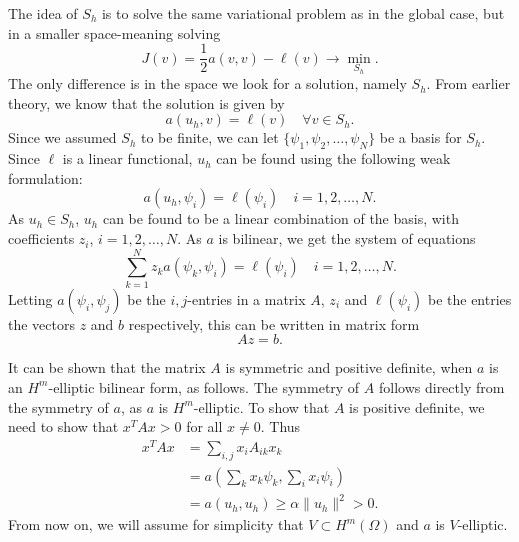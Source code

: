 The idea of $S_h$ is to solve the same variational problem as in the global case, 
but in a smaller space-meaning solving
\begin{equation*}
    J(v) = \frac{1}{2}a(v,v) - \ell(v) \to \underset{S_h}{\min}.
\end{equation*}
The only difference is in the space we look for a solution, namely $S_h$. From 
earlier theory, we know that the solution is given by 
\begin{equation*}
    a(u_h,v) = \ell(v) \quad \forall v \in S_h.
\end{equation*}
Since we assumed $S_h$ to be finite, we can let $ \{ \psi_1, \psi_2, \ldots, \psi_N \}$ 
be a basis for $S_h$. Since $\ell$ is a linear functional, 
$u_h$ can be found using the following weak formulation:
\begin{equation*}
    a(u_h, \psi_i) = \ell(\psi_i) \quad i = 1, 2, \ldots, N.
\end{equation*}
As $u_h \in S_h$, $u_h$ can be found to be a linear combination of the basis, with 
coefficients $z_i$, $i=1, 2, \ldots, N$. As $a$ is bilinear, we get the system of 
equations
\begin{equation*}
    \sum_{k=1}^N z_k a(\psi_k,\psi_i) = \ell(\psi_i) \quad i = 1,2,\ldots,N.
\end{equation*}
Letting $a(\psi_i,\psi_j)$ be the $i,j$-entries in a matrix $A$, $z_i$ and $\ell(\psi_i)$ 
be the entries the vectors $z$ and $b$ respectively, this can be written in matrix form 
\begin{equation*}
    Az = b.
\end{equation*}

It can be shown that the matrix $A$ is symmetric and positive definite, when $a$ is an $H^m$-elliptic bilinear form, as follows. 
The symmetry of $A$ follows directly from the symmetry of $a$, as $a$ is $H^m$-elliptic.
To show that $A$ is positive definite, we need to show that $x^T Ax > 0$ for all $x \neq 0$. Thus
\begin{align*}
    x^T Ax &= \sum_{i,j} x_i A_{ik}x_k \\
    &= a\left(\sum_{k} x_k\psi_k,\sum_{i} x_i\psi_i\right) \\
    &= a(u_h,u_h) \geq \alpha \|u_h\|^2 > 0.
\end{align*}
From now on, we will assume for simplicity that $V\subset H^m(\Omega)$ and $a$ is $V$-elliptic.